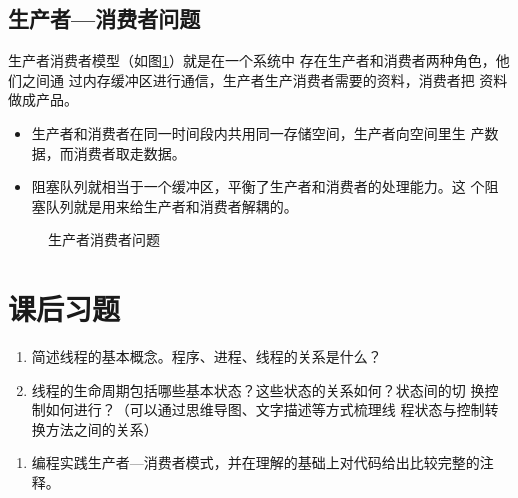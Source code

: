 \subsection{生产者—消费者问题}

生产者消费者模型（如图\ref{fig:producer-and-consumer}）就是在一个系统中
存在{\hei\Red 生产者}和{\hei\Red 消费者}两种角色，他们之间通
过{\hei\Blue 内存缓冲区}进行通信，生产者生产消费者需要的资料，消费者把
资料做成产品。
  

\begin{itemize}
\item 生产者和消费者在同一时间段内共用同一存储空间，生产者向空间里生
  产数据，而消费者取走数据。
\item 阻塞队列就相当于一个缓冲区，平衡了生产者和消费者的处理能力。这
  个阻塞队列就是用来给生产者和消费者解耦的。
\end{itemize}

\begin{figure}[htb]
\centering
{}
\caption{生产者消费者问题}
\label{fig:producer-and-consumer}
\end{figure}


\section{课后习题}


\begin{enumerate}
\item 简述线程的基本概念。程序、进程、线程的关系是什么？
\item 线程的生命周期包括哪些基本状态？这些状态的关系如何？状态间的切
  换控制如何进行？（{\kai\Blue 可以通过思维导图、文字描述等方式梳理线
    程状态与控制转换方法之间的关系}）
\end{enumerate}


\begin{enumerate}
\item 编程实践生产者—消费者模式，并在理解的基础上对代码给出比较完整的注释。
\end{enumerate}